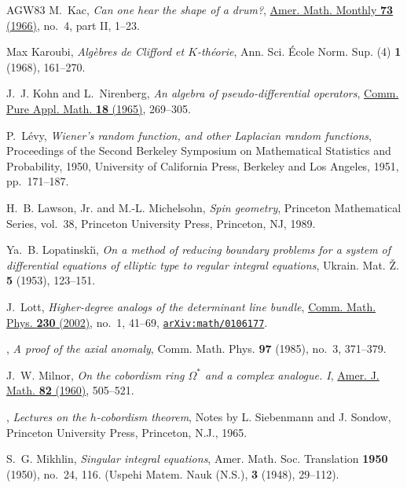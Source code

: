 \documentclass[11pt]{amsart}
\theoremstyle{definition}
\theoremstyle{remark}
\theoremstyle{plain}
\numberwithin{equation}{section}
\renewcommand{\:}{\colon}
\begin{document}
\begin{thebibliography}{AGW83}
M.~Kac, \emph{Can one hear the shape of a drum?},
  \href{http://dx.doi.org/10.2307/2313748}{Amer. Math. Monthly \textbf{73}
  (1966)}, no.~4, part II, 1--23.

Max Karoubi, \emph{Alg{\`e}bres de {C}lifford et {$K$}-th\'{e}orie}, Ann. Sci.
  \'{E}cole Norm. Sup. (4) \textbf{1} (1968), 161--270.

J.~J. Kohn and L.~Nirenberg, \emph{An algebra of pseudo-differential
  operators}, \href{http://dx.doi.org/10.1002/cpa.3160180121}{Comm. Pure Appl.
  Math. \textbf{18} (1965)}, 269--305.

P.~L\'{e}vy, \emph{Wiener's random function, and other {L}aplacian random
  functions}, Proceedings of the {S}econd {B}erkeley {S}ymposium on
  {M}athematical {S}tatistics and {P}robability, 1950, University of California
  Press, Berkeley and Los Angeles, 1951, pp.~171--187.

H.~B. Lawson, Jr. and M.-L. Michelsohn, \emph{Spin geometry}, Princeton
  Mathematical Series, vol.~38, Princeton University Press, Princeton, NJ,
  1989.

Ya.~B. Lopatinski\u{\i}, \emph{On a method of reducing boundary problems for a
  system of differential equations of elliptic type to regular integral
  equations}, Ukrain. Mat. \v{Z}. \textbf{5} (1953), 123--151.

J.~Lott, \emph{Higher-degree analogs of the determinant line bundle},
  \href{http://dx.doi.org/10.1007/s00220-002-0686-3}{Comm. Math. Phys.
  \textbf{230} (2002)}, no.~1, 41--69,
  \href{http://arxiv.org/abs/arXiv:math/0106177}{{\tt arXiv:math/0106177}}.

\bysame, \emph{A proof of the axial anomaly}, Comm. Math. Phys. \textbf{97}
  (1985), no.~3, 371--379.

J.~W. Milnor, \emph{On the cobordism ring {$\Omega ^{\ast} $} and a complex
  analogue. {I}}, \href{http://dx.doi.org/10.2307/2372970}{Amer. J. Math.
  \textbf{82} (1960)}, 505--521.

\bysame, \emph{Lectures on the {$h$}-cobordism theorem}, Notes by L. Siebenmann
  and J. Sondow, Princeton University Press, Princeton, N.J., 1965.

S.~G. Mikhlin, \emph{Singular integral equations}, Amer. Math. Soc. Translation
  \textbf{1950} (1950), no.~24, 116. (Uspehi Matem. Nauk (N.S.), {\bf 3}
  (1948), 29--112).


\end{thebibliography}
\end{document}
